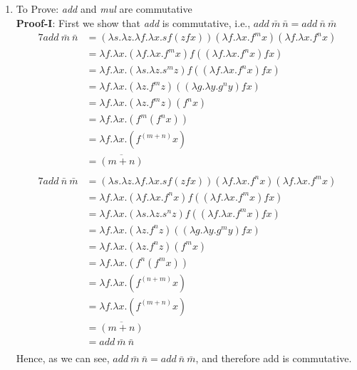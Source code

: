 \documentclass[11pt]{article}
\begin{document}
\begin{enumerate}
\begin{enumerate}
        \item To Prove: \textit{add} and \textit{mul} are commutative\\
    \textbf{Proof-I}: First we show that \textit{add}  is commutative, i.e., $add\: \bar{m} \: \bar{n}=add\:\bar{n} \: \bar{m}$ \\
    \begin{alignat*}{7}
    add\:\bar{m}\:\bar{n}  &= (\lambda s.\lambda z.\lambda f.\lambda x. s f (z f x))(\lambda f.\lambda x. f^m x)(\lambda f.\lambda x. f^n x)\\
     &= \lambda f.\lambda x. (\lambda f.\lambda x. f^m x) f ((\lambda f.\lambda x. f^n x)f x)\\
    &= \lambda f.\lambda x. (\lambda s.\lambda z. s^m z) f ((\lambda f.\lambda x. f^n x)f x)\\
    &= \lambda f.\lambda x. (\lambda z. f^m z)((\lambda g.\lambda y. g^n y)f x)\\
    &= \lambda f.\lambda x. (\lambda z. f^m z)(f^n x)\\
    &= \lambda f.\lambda x. ( f^m (f^n x))\\
    &= \lambda f.\lambda x. ( f^{(m+n)} x)\\
                    &= \overline{(m+n)}\\
    \end{alignat*}
        \begin{alignat*}{7}
    add\:\bar{n}\:\bar{m}  &= (\lambda s.\lambda z.\lambda f.\lambda x. s f (z f x))(\lambda f.\lambda x. f^n x)(\lambda f.\lambda x. f^m x)\\
     &= \lambda f.\lambda x. (\lambda f.\lambda x. f^n x) f ((\lambda f.\lambda x. f^m x)f x)\\
    &= \lambda f.\lambda x. (\lambda s.\lambda z. s^n z) f ((\lambda f.\lambda x. f^m x)f x)\\
    &= \lambda f.\lambda x. (\lambda z. f^n z)((\lambda g.\lambda y. g^m y)f x)\\
    &= \lambda f.\lambda x. (\lambda z. f^n z)(f^m x)\\
    &= \lambda f.\lambda x. ( f^n (f^m x))\\
    &= \lambda f.\lambda x. ( f^{(n+m)} x)\\
    &= \lambda f.\lambda x. ( f^{(m+n)} x)\\
                    &= \overline{(m+n)}\\
    &= add\:\bar{m}\:\bar{n}\\
    \end{alignat*}
 Hence, as we can see, $add\: \bar{m} \: \bar{n}=add\:\bar{n} \: \bar{m}$, and therefore add is commutative.  \\ 

\end{enumerate}
\end{enumerate}
\end{document}
